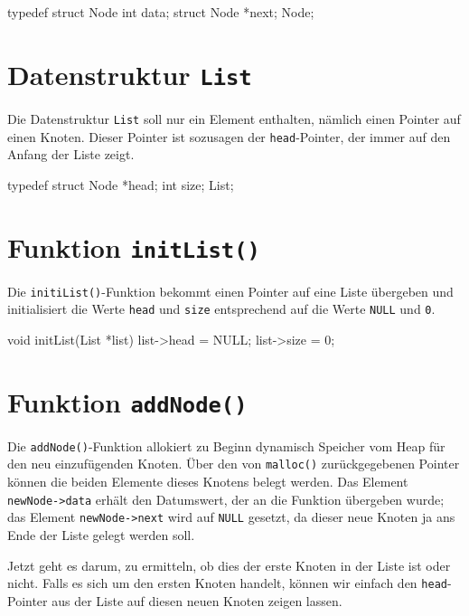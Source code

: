 \begin{codebox}[lang=c, fontsize=\small]
typedef struct Node {
    int data;
    struct Node *next;
} Node;
\end{codebox}

\section*{Datenstruktur \texttt{List}}

Die Datenstruktur \texttt{List} soll nur ein Element enthalten, nämlich
einen Pointer auf einen Knoten. Dieser Pointer ist sozusagen der
\texttt{head}-Pointer, der immer auf den Anfang der Liste zeigt.

\begin{codebox}[lang=c, fontsize=\small]
typedef struct {
    Node *head;
    int size;
} List;
\end{codebox}

\section*{Funktion \texttt{initList()}}

Die \texttt{initiList()}-Funktion bekommt einen Pointer auf eine Liste
übergeben und initialisiert die Werte \texttt{head} und
\texttt{size} entsprechend auf die Werte \texttt{NULL} und
\texttt{0}.

\begin{codebox}[lang=c, fontsize=\small]
void initList(List *list) {
    list->head = NULL;
    list->size = 0;
}
\end{codebox}

\section*{Funktion \texttt{addNode()}}

Die \texttt{addNode()}-Funktion allokiert zu Beginn dynamisch Speicher
vom Heap für den neu einzufügenden Knoten. Über den von \texttt{malloc()}
zurückgegebenen Pointer können die beiden Elemente dieses Knotens belegt werden.
Das Element \texttt{newNode->data} erhält den Datumswert, der an die
Funktion übergeben wurde; das Element \texttt{newNode->next} wird auf
\texttt{NULL} gesetzt, da dieser neue Knoten ja ans Ende der Liste gelegt
werden soll.

Jetzt geht es darum, zu ermitteln, ob dies der erste Knoten in der Liste ist
oder nicht. Falls es sich um den ersten Knoten handelt, können wir einfach den
\texttt{head}-Pointer aus der Liste auf diesen neuen Knoten zeigen
lassen.

